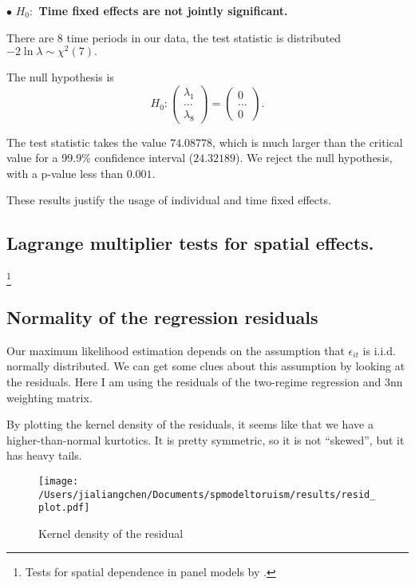\documentclass[11pt,a4paper]{amsart}
\theoremstyle{plain}
\theoremstyle{definition}
\begin{document}
$\bullet$ \textbf{$H_{0}:$ Time fixed effects are not jointly significant.} 
		
There are $8$ time periods in our data, the test statistic is distributed  $-2 \ln \lambda \sim \chi^{2}(7).$
		
The null hypothesis is 
\[	H_{0}: \begin{pmatrix}
		\lambda_{1} \\
		\dots \\
		\lambda_{8}
\end{pmatrix} = \begin{pmatrix}
		0 \\
		\dots \\
		0
\end{pmatrix}.	\]
		
The test statistic takes the value $74.08778$, which is much larger than the critical value for a 99.9\% confidence interval ($24.32189$). We reject the null hypothesis, with a p-value less than $0.001$.
		
These results justify the usage of individual and time fixed effects. 
		
\subsection{Lagrange multiplier tests for spatial effects.}\footnote{Tests for spatial dependence in panel models by \parencite{anselinSpatialPanelEconometrics2008}.}\hfill\par
		
\subsection{Normality of the regression residuals}\hfill\par

Our maximum likelihood estimation depends on the assumption that $\epsilon_{it}$ is i.i.d. normally distributed. We can get some clues about this assumption by looking at the residuals. Here I am using the residuals of the two-regime regression and 3nn weighting matrix. 

By plotting the kernel density of the residuals, it seems like that we have a higher-than-normal kurtotics. It is pretty symmetric, so it is not ``skewed'', but it has heavy tails.

\begin{figure}[hbt]
	{\centering \texttt{[image: /Users/jialiangchen/Documents/spmodeltoruism/results/resid\_plot.pdf]}}
	\caption{Kernel density of the residual}\label{F:kden_resid}
\end{figure}
\end{document}
